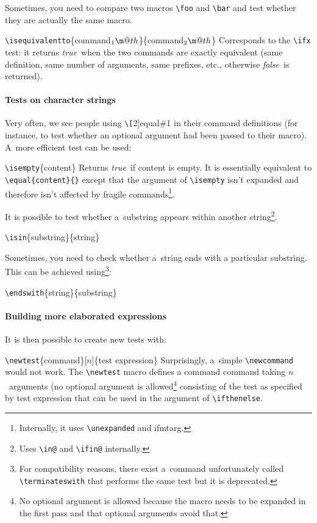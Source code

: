 \documentclass{article}
\makeatletter
\newcommand*{\cmd}[1]{\tex{\textbackslash #1}}
\newcommand*{\tex}{\texttt}
\newenvironment*{texcode}{\list{}{}\item\ttfamily}{\endlist}
\newcommand*{\marg}[1]{\{\meta{#1}\}}
\newcommand*{\meta}[1]{\textnormal{\textlangle#1\textrangle}}
\newcommand*{\1}{$_1\m@th$}
\newcommand*{\2}{$_2\m@th$}
\newcommand*{\pack}{\textsf}
\newcommand*{\true}{\emph{true}}
\newcommand*{\false}{\emph{false}}
\makeatother
\begin{document}
Sometimes, you need to compare two macros \cmd{foo} and \cmd{bar} and
test whether they are actually the same macro.
%
\begin{texcode}
  \cmd{isequivalentto}\marg{command\1}\marg{command\2}
\end{texcode}
%
Corresponds to the \cmd{ifx} test: it returns \true\ when the two
commands are exactly equivalent (same definition, same number of
arguments, same prefixes, etc., otherwise \false\ is returned).

\paragraph{Tests on character strings}

Very often, we see people using \cmd[2]{equal}{\#1}{} in their command
definitions (for instance, to test whether an optional argument had
been passed to their macro).  A~more efficient test can be used:
%
\begin{texcode}
  \cmd{isempty}\marg{content}
\end{texcode}
%
Returns \true\ if \meta{content} is empty.  It is essentially equivalent to
\tex{\cmd{equal}\{\meta{content}\}\{\}} except that the argument of
\cmd{isempty} isn't expanded and therefore isn't affected by fragile
commands\footnote{Internally, it uses \cmd{unexpanded} and \pack{ifmtarg}.}.

It is possible to test whether a~substring appears within another
string\footnote{Uses \cmd{in@} and \cmd{ifin@} internally.}.
%
\begin{texcode}
  \cmd{isin}\marg{substring}\marg{string}
\end{texcode}

Sometimes, you need to check whether a~string ends with a particular
substring.  This can be achieved using\footnote{For compatibility
  reasons, there exist a~command unfortunately called
  \cmd{terminateswith} that performs the same test but it is
  deprecated.}:
%
\begin{texcode}
  \cmd{endswith}\marg{string}\marg{substring}
\end{texcode}

\paragraph{Building more elaborated expressions}

It is then possible to create new tests with:
%
\begin{texcode}
  \cmd{newtest}\marg{command}[$n$]\marg{test expression}
\end{texcode}
%
Surprisingly, a~simple \cmd{newcommand} would not work.  The
\cmd{newtest} macro defines a command \meta{command} taking
$n$~arguments (no optional argument is allowed\footnote{No optional
  argument is allowed because the macro needs to be expanded in the
  first pass and that optional arguments avoid that.} consisting of
the test as specified by \meta{test expression} that can be used in
the argument of \cmd{ifthenelse}.
\end{document}
